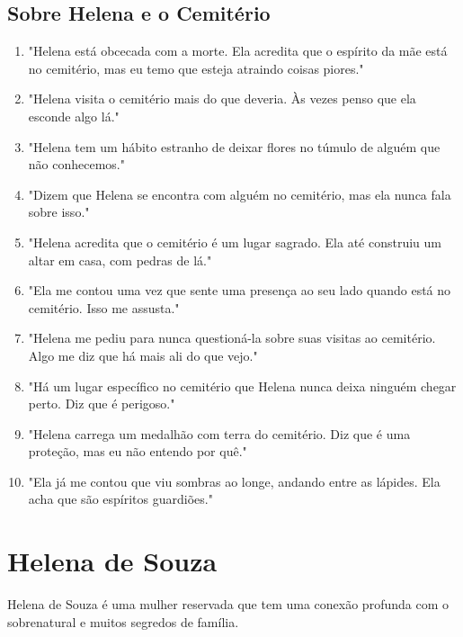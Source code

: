 \subsection*{Sobre Helena e o Cemitério}
\begin{enumerate}
    \item "Helena está obcecada com a morte. Ela acredita que o espírito da mãe está no cemitério, mas eu temo que esteja atraindo coisas piores."
    \item "Helena visita o cemitério mais do que deveria. Às vezes penso que ela esconde algo lá."
    \item "Helena tem um hábito estranho de deixar flores no túmulo de alguém que não conhecemos."
    \item "Dizem que Helena se encontra com alguém no cemitério, mas ela nunca fala sobre isso."
    \item "Helena acredita que o cemitério é um lugar sagrado. Ela até construiu um altar em casa, com pedras de lá."
    \item "Ela me contou uma vez que sente uma presença ao seu lado quando está no cemitério. Isso me assusta."
    \item "Helena me pediu para nunca questioná-la sobre suas visitas ao cemitério. Algo me diz que há mais ali do que vejo."
    \item "Há um lugar específico no cemitério que Helena nunca deixa ninguém chegar perto. Diz que é perigoso."
    \item "Helena carrega um medalhão com terra do cemitério. Diz que é uma proteção, mas eu não entendo por quê."
    \item "Ela já me contou que viu sombras ao longe, andando entre as lápides. Ela acha que são espíritos guardiões."
\end{enumerate}

\section{Helena de Souza}
Helena de Souza é uma mulher reservada que tem uma conexão profunda com o sobrenatural e muitos segredos de família.

